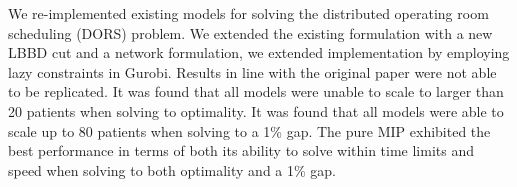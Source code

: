 We re-implemented existing models\cite{roshanaei2017propagating} for solving the distributed operating room scheduling (DORS) problem. We extended the existing formulation with a new LBBD cut and a network formulation, we extended implementation by employing lazy constraints in Gurobi. Results in line with the original paper were not able to be replicated. It was found that all models were unable to scale to larger than 20 patients when solving to optimality. It was found that all models were able to scale up to 80 patients when solving to a 1\% gap. The pure MIP exhibited the best performance in terms of both its ability to solve within time limits and speed when solving to both optimality and a 1\% gap. 

